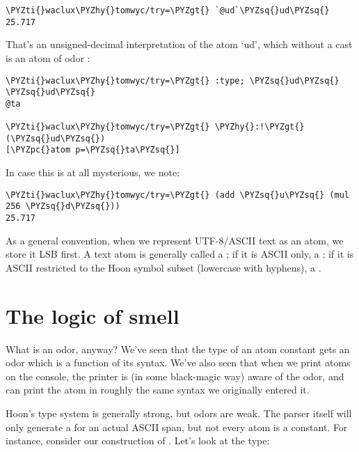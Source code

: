 \begin{framed_shaded}
\begin{Verbatim}[fontsize=\relsize{-2.5},fontseries=b,commandchars=\\\{\}]
\PYZti{}waclux\PYZhy{}tomwyc/try=\PYZgt{} `@ud`\PYZsq{}ud\PYZsq{}
25.717
\end{Verbatim}
\end{framed_shaded}
That's an unsigned-decimal interpretation of the atom `ud', which
without a cast is an atom of odor :

\begin{framed_shaded}
\begin{Verbatim}[fontsize=\relsize{-2.5},fontseries=b,commandchars=\\\{\}]
\PYZti{}waclux\PYZhy{}tomwyc/try=\PYZgt{} :type; \PYZsq{}ud\PYZsq{}
\PYZsq{}ud\PYZsq{}
@ta

\PYZti{}waclux\PYZhy{}tomwyc/try=\PYZgt{} \PYZhy{}:!\PYZgt{}(\PYZsq{}ud\PYZsq{})
[\PYZpc{}atom p=\PYZsq{}ta\PYZsq{}]
\end{Verbatim}
\end{framed_shaded}
In case this is at all mysterious, we note:

\begin{framed_shaded}
\begin{Verbatim}[fontsize=\relsize{-2.5},fontseries=b,commandchars=\\\{\}]
\PYZti{}waclux\PYZhy{}tomwyc/try=\PYZgt{} (add \PYZsq{}u\PYZsq{} (mul 256 \PYZsq{}d\PYZsq{}))
25.717
\end{Verbatim}
\end{framed_shaded}
As a general convention, when we represent UTF-8/ASCII text as an
atom, we store it LSB first.  A text atom is generally called a
; if it is ASCII only, a ; if it is ASCII restricted
to the Hoon symbol subset (lowercase with hyphens), a .

\section{The logic of smell}

What is an odor, anyway?  We've seen that the type of an atom
constant gets an odor which is a function of its syntax.  We've
also seen that when we print atoms on the console, the printer is
(in some black-magic way) aware of the odor, and can print the
atom in roughly the same syntax we originally entered it.

Hoon's type system is generally strong, but odors are weak.  The
parser itself will only generate a  for an actual ASCII
span, but not every atom is a constant.  For instance, consider
our construction of .  Let's look at the type:

